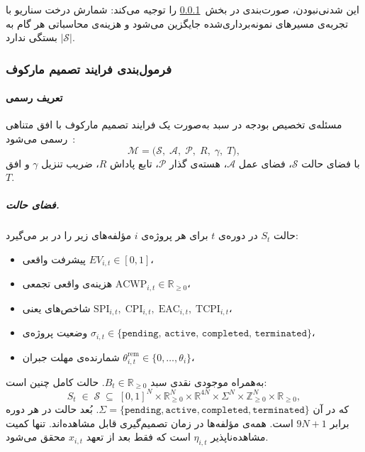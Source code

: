 این شدنی‌نبودن، صورت‌بندی  در بخش~\ref{subsec:mdp} را توجیه
می‌کند: شمارش درخت سناریو با تجربه‌ی مسیرهای نمونه‌برداری‌شده جایگزین
می‌شود و هزینه‌ی محاسباتی هر گام به $|\mathcal{S}|$ بستگی ندارد.

\subsubsection{فرمول‌بندی فرایند تصمیم مارکوف}
\label{subsec:mdp}

\paragraph{تعریف رسمی }
\label{subsubsec:mdp_def}

\begin{definition}
\label{def:mdp}
مسئله‌ی تخصیص بودجه در سبد به‌صورت یک فرایند تصمیم مارکوف با افق
متناهی رسمی می‌شود~\citep{Puterman1994}:
\begin{equation}
  \mathcal{M} = \bigl(\mathcal{S},\;\mathcal{A},\;
    \mathcal{P},\;R,\;\gamma,\;T\bigr),
  \label{eq:mdp_tuple}
\end{equation}
با فضای حالت $\mathcal{S}$، فضای عمل $\mathcal{A}$، هسته‌ی گذار
$\mathcal{P}$، تابع پاداش $R$، ضریب تنزیل $\gamma$ و افق $T$.
\end{definition}

\subparagraph{فضای حالت.}
حالت $S_t$ در دوره‌ی $t$ برای هر پروژه‌ی $i$ مؤلفه‌های زیر را در بر
می‌گیرد:
\begin{itemize}[nosep]
  \item پیشرفت واقعی $EV_{i,t} \in [0,1]$،
  \item هزینه‌ی واقعی تجمعی $\mathrm{ACWP}_{i,t} \in \mathbb{R}_{\geq 0}$،
  \item شاخص‌های  یعنی $\mathrm{SPI}_{i,t},\; \mathrm{CPI}_{i,t},\;
        \mathrm{EAC}_{i,t},\; \mathrm{TCPI}_{i,t}$،
  \item وضعیت پروژه‌ی $\sigma_{i,t} \in \{\texttt{pending},\,
        \texttt{active},\, \texttt{completed},\, \texttt{terminated}\}$،
  \item شمارنده‌ی مهلت جبران $\theta^{\mathrm{rem}}_{i,t} \in
        \{0, \ldots, \theta_i\}$،
\end{itemize}
به‌همراه موجودی نقدی سبد $B_t \in \mathbb{R}_{\geq 0}$. حالت کامل
چنین است:
\begin{equation}
  S_t \;\in\; \mathcal{S}
  \;\subseteq\; [0,1]^N \times \mathbb{R}^N_{\geq 0}
    \times \mathbb{R}^{4N} \times \Sigma^N
    \times \mathbb{Z}^N_{\geq 0} \times \mathbb{R}_{\geq 0},
  \label{eq:state_space}
\end{equation}
که در آن $\Sigma = \{\texttt{pending},\texttt{active},\texttt{completed},
\texttt{terminated}\}$. بُعد حالت در هر دوره برابر $9N+1$ است. همه‌ی
مؤلفه‌ها در زمان تصمیم‌گیری قابل مشاهده‌اند. تنها کمیت مشاهده‌ناپذیر
$\eta_{i,t}$ است که فقط بعد از تعهد $x_{i,t}$ محقق می‌شود.

